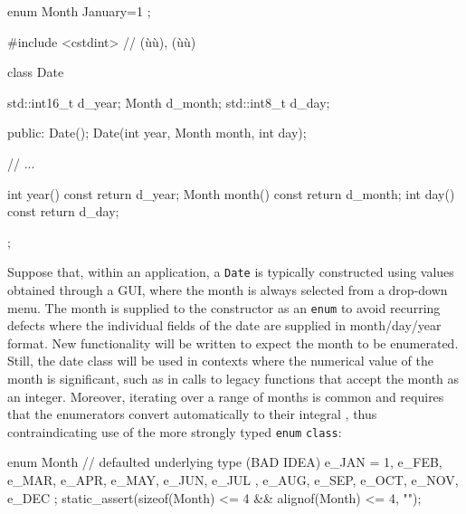 \begin{emcppshiddenlisting}[emcppsbatch=e1]
enum Month { January=1 };
\end{emcppshiddenlisting}
\begin{emcppslisting}[emcppsbatch=e1]
#include <cstdint>  // (ù{}ù), (ù{}ù)

class Date
{
    std::int16_t d_year;
    Month        d_month;
    std::int8_t  d_day;

public:
    Date();
    Date(int year, Month month, int day);

    // ...

    int year() const    { return d_year; }
    Month month() const { return d_month; }
    int day() const     { return d_day; }
};
\end{emcppslisting}

\noindent Suppose that, within an application, a \lstinline!Date! is typically constructed using
values obtained through a GUI, where the month is always selected
from a drop-down menu. The month is
supplied to the constructor as an \lstinline!enum! to avoid recurring
defects where the individual fields of the date are supplied in
month/day/year format. New functionality will be written to expect the
month to be enumerated. Still, the date class will be used in contexts
where the numerical value of the month is significant, such as in calls
to legacy functions that accept the month as an integer. Moreover,
iterating over a range of months is common and requires that the
enumerators convert automatically to their integral , thus contraindicating use of the more strongly typed
\lstinline!enum! \lstinline!class!:

\begin{emcppslisting}
enum Month // defaulted underlying type (BAD IDEA)
{
    e_JAN = 1, e_FEB, e_MAR, e_APR, e_MAY, e_JUN,
    e_JUL , e_AUG, e_SEP, e_OCT, e_NOV, e_DEC
};
static_assert(sizeof(Month) <= 4 && alignof(Month) <= 4, "");
\end{emcppslisting}

%


